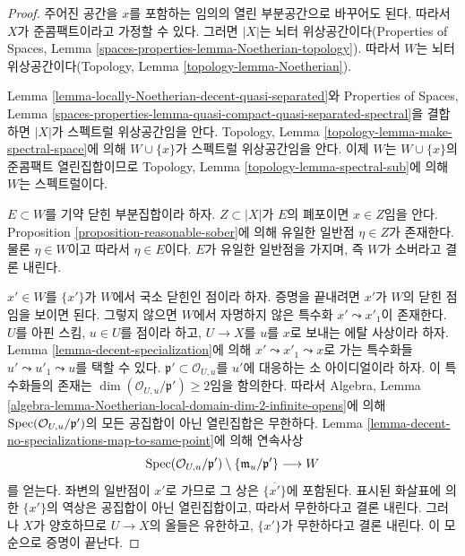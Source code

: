 \begin{proof}
주어진 공간을 $x$를 포함하는 임의의 열린 부분공간으로 바꾸어도 된다.
따라서 $X$가 준콤팩트이라고 가정할 수 있다. 그러면 $|X|$는 뇌터
위상공간이다(Properties of Spaces, Lemma
\ref{spaces-properties-lemma-Noetherian-topology}). 따라서 $W$는
뇌터 위상공간이다(Topology, Lemma \ref{topology-lemma-Noetherian}).

\medskip\noindent
Lemma \ref{lemma-locally-Noetherian-decent-quasi-separated}와
Properties of Spaces, Lemma
\ref{spaces-properties-lemma-quasi-compact-quasi-separated-spectral}을
결합하면 $|X|$가 스펙트럴 위상공간임을 안다. Topology, Lemma
\ref{topology-lemma-make-spectral-space}에 의해
$W \cup \{x\}$가 스펙트럴 위상공간임을 안다. 이제 $W$는
$W \cup \{x\}$의 준콤팩트 열린집합이므로 Topology, Lemma
\ref{topology-lemma-spectral-sub}에 의해 $W$는 스펙트럴이다.

\medskip\noindent
$E \subset W$를 기약 닫힌 부분집합이라 하자. $Z \subset |X|$가
$E$의 폐포이면 $x \in Z$임을 안다. Proposition
\ref{proposition-reasonable-sober}에 의해 유일한 일반점
$\eta \in Z$가 존재한다. 물론 $\eta \in W$이고 따라서
$\eta \in E$이다. $E$가 유일한 일반점을 가지며, 즉 $W$가
소버라고 결론 내린다.

\medskip\noindent
$x' \in W$를 $\{x'\}$가 $W$에서 국소 닫힌인 점이라 하자.
증명을 끝내려면 $x'$가 $W$의 닫힌 점임을 보이면 된다.
그렇지 않으면 $W$에서 자명하지 않은 특수화 $x' \leadsto x'_1$이
존재한다. $U$를 아핀 스킴, $u \in U$를 점이라 하고,
$U \to X$를 $u$를 $x$로 보내는 에탈 사상이라 하자.
Lemma \ref{lemma-decent-specialization}에 의해
$x' \leadsto x'_1 \leadsto x$로 가는 특수화들
$u' \leadsto u'_1 \leadsto u$를 택할 수 있다.
$\mathfrak p' \subset \mathcal{O}_{U, u}$를 $u'$에 대응하는 소
아이디얼이라 하자. 이 특수화들의 존재는
$\dim(\mathcal{O}_{U, u}/\mathfrak p') \geq 2$임을 함의한다.
따라서 Algebra, Lemma
\ref{algebra-lemma-Noetherian-local-domain-dim-2-infinite-opens}에 의해
$\mathop{\mathrm{Spec}}(\mathcal{O}_{U, u}/\mathfrak p')$의 모든 공집합이 아닌
열린집합은 무한하다. Lemma
\ref{lemma-decent-no-specializations-map-to-same-point}에 의해 연속사상
$$
\mathop{\mathrm{Spec}}(\mathcal{O}_{U, u}/\mathfrak p')
\setminus \{\mathfrak m_u/\mathfrak p'\}
\longrightarrow
W
$$
를 얻는다. 좌변의 일반점이 $x'$로 가므로 그 상은
$\overline{\{x'\}}$에 포함된다. 표시된 화살표에 의한 $\{x'\}$의
역상은 공집합이 아닌 열린집합이고, 따라서 무한하다고 결론 내린다.
그러나 $X$가 양호하므로 $U \to X$의 올들은 유한하고,
$\{x'\}$가 무한하다고 결론 내린다. 이 모순으로 증명이 끝난다.
\end{proof}

